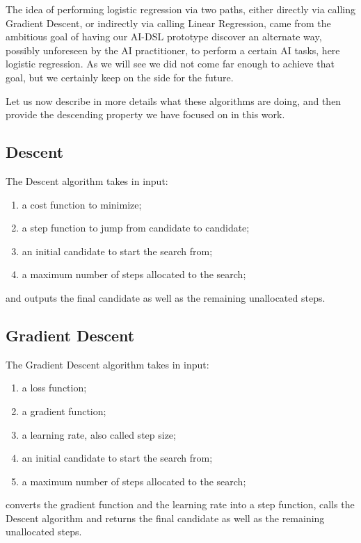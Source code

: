 \documentclass[]{report}
\begin{document}
The idea of performing logistic regression via two paths, either
directly via calling Gradient Descent, or indirectly via calling
Linear Regression, came from the ambitious goal of having our AI-DSL
prototype discover an alternate way, possibly unforeseen by the AI
practitioner, to perform a certain AI tasks, here logistic regression.
As we will see we did not come far enough to achieve that goal, but we
certainly keep on the side for the future.

Let us now describe in more details what these algorithms are doing,
and then provide the descending property we have focused on in this
work.

\subsection{Descent}
The Descent algorithm takes in input:
\begin{enumerate}
\item a cost function to minimize;
\item a step function to jump from candidate to candidate;
\item an initial candidate to start the search from;
\item a maximum number of steps allocated to the search;
\end{enumerate}
and outputs the final candidate as well as the remaining unallocated
steps.

\subsection{Gradient Descent}
The Gradient Descent algorithm takes in input:
\begin{enumerate}
\item a loss function;
\item a gradient function;
\item a learning rate, also called step size;
\item an initial candidate to start the search from;
\item a maximum number of steps allocated to the search;
\end{enumerate}
converts the gradient function and the learning rate into a step
function, calls the Descent algorithm and returns the final candidate
as well as the remaining unallocated steps.
\end{document}

